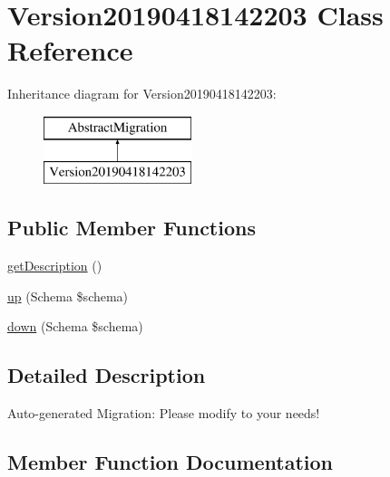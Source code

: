 \hypertarget{class_doctrine_migrations_1_1_version20190418142203}{}\section{Version20190418142203 Class Reference}
\label{class_doctrine_migrations_1_1_version20190418142203}
Inheritance diagram for Version20190418142203\+:\begin{figure}[H]
\begin{center}
\leavevmode
\includegraphics[height=2.000000cm]{class_doctrine_migrations_1_1_version20190418142203}
\end{center}
\end{figure}
\subsection*{Public Member Functions}
\begin{DoxyCompactItemize}
\item 
\mbox{\hyperlink{class_doctrine_migrations_1_1_version20190418142203_a2e7bb35c71bf1824456ceb944cb7a845}{get\+Description}} ()
\item 
\mbox{\hyperlink{class_doctrine_migrations_1_1_version20190418142203_a23eb1c1428e8ea2ab2cf798fc06ec421}{up}} (Schema \$schema)
\item 
\mbox{\hyperlink{class_doctrine_migrations_1_1_version20190418142203_aa8eb70255a46429d4d6165c778c9e5b9}{down}} (Schema \$schema)
\end{DoxyCompactItemize}


\subsection{Detailed Description}
Auto-\/generated Migration\+: Please modify to your needs! 

\subsection{Member Function Documentation}
\mbox{\label{class_doctrine_migrations_1_1_version20190418142203_aa8eb70255a46429d4d6165c778c9e5b9}} 

